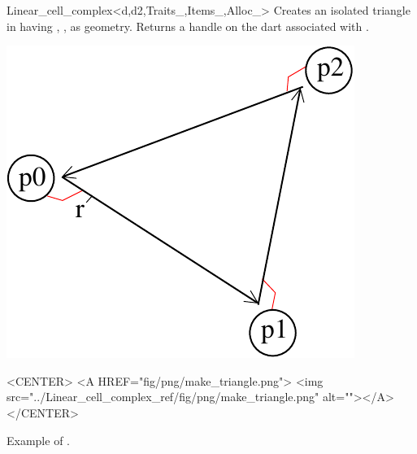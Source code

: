 \begin{ccRefClass}{Linear_cell_complex<d,d2,Traits_,Items_,Alloc_>}
{Creates an isolated triangle in  having , ,  as geometry.
   Returns a handle on the dart associated with .
}
%
\def\LargFig{.3\textwidth}
  \begin{ccTexOnly}
    \begin{center}
      \includegraphics[width=\LargFig]{Linear_cell_complex_ref/fig/pdf/make_triangle}
    \end{center}
  \end{ccTexOnly}
  \begin{ccHtmlOnly}
    <CENTER>
    <A HREF="fig/png/make_triangle.png">
        <img src="../Linear_cell_complex_ref/fig/png/make_triangle.png" alt=""></A>
    </CENTER>
    \end{ccHtmlOnly}
    \centerline{Example of .}


\end{ccRefClass}
